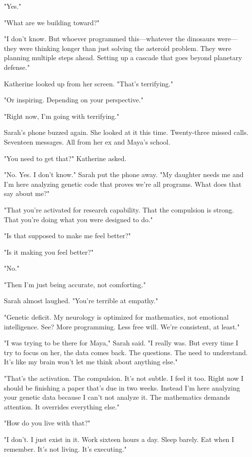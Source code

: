 "Yes."

"What are we building toward?"

"I don't know. But whoever programmed this—whatever the dinosaurs were—they were thinking longer than just solving the asteroid problem. They were planning multiple steps ahead. Setting up a cascade that goes beyond planetary defense."

Katherine looked up from her screen. "That's terrifying."

"Or inspiring. Depending on your perspective."

"Right now, I'm going with terrifying."

Sarah's phone buzzed again. She looked at it this time. Twenty-three missed calls. Seventeen messages. All from her ex and Maya's school.

"You need to get that?" Katherine asked.

"No. Yes. I don't know." Sarah put the phone away. "My daughter needs me and I'm here analyzing genetic code that proves we're all programs. What does that say about me?"

"That you're activated for research capability. That the compulsion is strong. That you're doing what you were designed to do."

"Is that supposed to make me feel better?"

"Is it making you feel better?"

"No."

"Then I'm just being accurate, not comforting."

Sarah almost laughed. "You're terrible at empathy."

"Genetic deficit. My neurology is optimized for mathematics, not emotional intelligence. See? More programming. Less free will. We're consistent, at least."

"I was trying to be there for Maya," Sarah said. "I really was. But every time I try to focus on her, the data comes back. The questions. The need to understand. It's like my brain won't let me think about anything else."

"That's the activation. The compulsion. It's not subtle. I feel it too. Right now I should be finishing a paper that's due in two weeks. Instead I'm here analyzing your genetic data because I can't not analyze it. The mathematics demands attention. It overrides everything else."

"How do you live with that?"

"I don't. I just exist in it. Work sixteen hours a day. Sleep barely. Eat when I remember. It's not living. It's executing."

